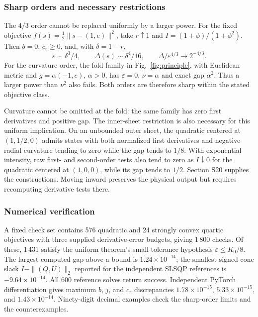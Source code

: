 \documentclass[10pt,a4paper]{article}
\begin{document}
\subsubsection{Sharp orders and necessary restrictions}
The $4/3$ order cannot be replaced uniformly by a larger power. For the fixed objective $f(s)=\tfrac12\|s-(1,e)\|^2$, take $r\uparrow1$ and $I=(1+\phi)/(1+\phi^2)$. Then $b=0$, $c_r\ge0$, and, with $\delta=1-r$,
\begin{equation}
 \varepsilon\sim\delta^3/4,\qquad
 \Delta(s)\sim\delta^4/16,\qquad
 \Delta/\varepsilon^{4/3}\to2^{-4/3}.
 \label{eq:stopsharpfirst}
\end{equation}
For the curvature order, the fold family in Fig.~\ref{fig:principle}, with Euclidean metric and $g=\alpha(-1,e)$, $\alpha>0$, has $\varepsilon=0$, $\nu=\alpha$ and exact gap $\alpha^2$. Thus a larger power than $\nu^2$ also fails. Both orders are therefore sharp within the stated objective class.

Curvature cannot be omitted at the fold: the same family has zero first derivatives and positive gap. The inner-sheet restriction is also necessary for this uniform implication. On an unbounded outer sheet, the quadratic centered at $(1,1/2,0)$ admits states with both normalized first derivatives and negative radial curvature tending to zero while the gap tends to $1/8$. With exponential intensity, raw first- and second-order tests also tend to zero as $I\downarrow0$ for the quadratic centered at $(1,0,0)$, while its gap tends to $1/2$. Section S20 supplies the constructions. Moving inward preserves the physical output but requires recomputing derivative tests there.

\subsubsection{Numerical verification}
A fixed check set contains 576 quadratic and 24 strongly convex quartic objectives with three supplied derivative-error budgets, giving 1\,800 checks. Of these, 1\,431 satisfy the uniform theorem's small-tolerance hypothesis $\varepsilon\le K_0/8$. The largest computed gap above a bound is $1.24\times10^{-14}$; the smallest signed cone slack $I-\|(Q,U)\|_2$ reported for the independent SLSQP references is $-9.64\times10^{-14}$. All 600 reference solves return success. Independent PyTorch differentiation gives maximum $b$, $j$, and $c_r$ discrepancies $1.78\times10^{-15}$, $5.33\times10^{-15}$, and $1.43\times10^{-14}$. Ninety-digit decimal examples check the sharp-order limits and the counterexamples.
\end{document}
